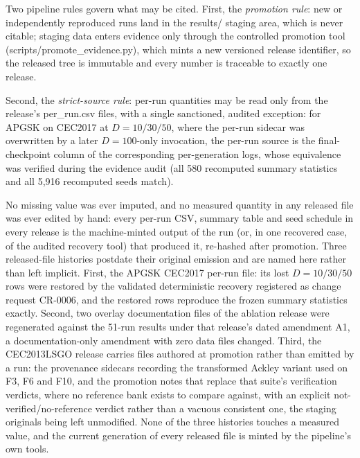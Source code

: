 \documentclass[10pt,a4paper]{article}
\newcommand{\apgsk}{APGSK}
\begin{document}
Two pipeline rules govern what may be cited.  First, the
\emph{promotion rule}: new or independently reproduced runs land in the
results/ staging area, which is never citable; staging data
enters evidence only through the controlled promotion tool
(scripts/promote\_evidence.py), which mints a new versioned
release identifier, so the released tree is immutable and every number
is traceable to exactly one release.

Second, the \emph{strict-source rule}: per-run quantities may be read
only from the release's per\_run.csv files, with a single
sanctioned, audited exception: for \apgsk{} on CEC2017 at
$D = 10/30/50$, where the per-run sidecar was overwritten by a later
$D = 100$-only invocation, the per-run source is the final-checkpoint
column of the corresponding per-generation logs, whose equivalence was
verified during the evidence audit (all 580 recomputed summary
statistics and all 5{,}916 recomputed seeds match).

No missing value was ever imputed, and no measured quantity in any
released file was ever edited by hand: every per-run CSV, summary table
and seed schedule in every release is the machine-minted output of the run
(or, in one recovered case, of the audited recovery tool) that
produced it, re-hashed after promotion.  Three released-file histories
postdate their original emission and are named here rather than left
implicit.  First, the \apgsk{} CEC2017 per-run file: its lost
$D = 10/30/50$ rows were restored by the validated deterministic recovery
registered as change request CR-0006, and the restored rows reproduce the
frozen summary statistics exactly.  Second, two overlay documentation
files of the ablation release were regenerated against the 51-run results
under that release's dated amendment A1, a documentation-only
amendment with zero data files changed.  Third, the CEC2013LSGO release
carries files authored at promotion rather than emitted by a run: the
provenance sidecars recording the transformed Ackley variant used on F3,
F6 and F10, and the promotion notes that replace that suite's
verification verdicts, where no reference bank exists to compare against,
with an explicit not-verified/no-reference verdict rather than a vacuous
consistent one, the staging originals being left unmodified.  None of the
three histories touches a measured value, and the current generation of
every released file is minted by the pipeline's own tools.
\end{document}

